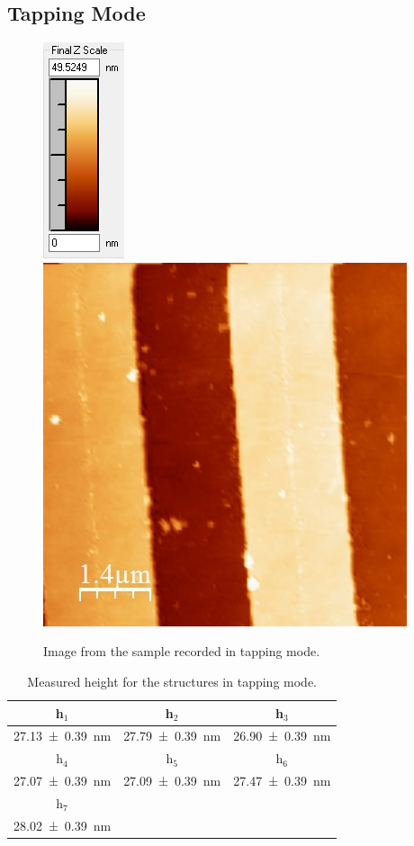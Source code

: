 \documentclass[%
 reprint,
amsmath,amssymb,
pra,
]{revtex4-1}
\begin{document}
\subsection{Tapping Mode}

\begin{figure}
\centering
\includegraphics[scale=0.7]{Bilder/Tapping_Mode/Rohdaten/try3_scalebar.PNG}
\includegraphics[scale=0.5]{Bilder/Tapping_Mode/Rohdaten/try3.JPG}
\caption{Image from the sample recorded in tapping mode.}
\label{fig:Tapping_raw_data}
\end{figure}

\begin{table}[h]
\centering
\begin{tabular}{|c|c|c|}
\hline 
h$_1$ & h$_2$ & h$_3$ \\ 
\hline 
\SI{27.13 \pm 0.39}{nm} & \SI{27.79 \pm 0.39}{nm} & \SI{26.90 \pm 0.39}{nm}  \\ 
\hline 
h$_4$ & h$_5$ & h$_6$ \\ 
\hline 
\SI{27.07 \pm 0.39}{nm} & \SI{27.09 \pm 0.39}{nm} & \SI{27.47 \pm 0.39}{nm}  \\ 
\hline 
 h$_7$ & & \\ 
\hline 
\SI{28.02 \pm 0.39}{nm} & &  \\ 
\hline 
\end{tabular} 
\caption{Measured height for the structures in tapping mode.}
\label{tab:Tapping_height}
\end{table}
\end{document}
